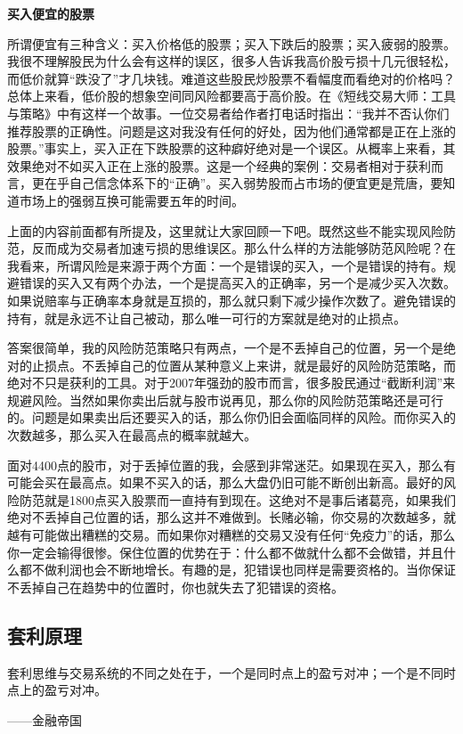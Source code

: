 \textbf{买入便宜的股票}

所谓便宜有三种含义：买入价格低的股票；买入下跌后的股票；买入疲弱的股票。我很不理解股民为什么会有这样的误区，很多人告诉我高价股亏损十几元很轻松，而低价就算“跌没了”才几块钱。难道这些股民炒股票不看幅度而看绝对的价格吗？总体上来看，低价股的想象空间同风险都要高于高价股。在《短线交易大师：工具与策略》中有这样一个故事。一位交易者给作者打电话时指出：“我并不否认你们推荐股票的正确性。问题是这对我没有任何的好处，因为他们通常都是正在上涨的股票。”事实上，买入正在下跌股票的这种癖好绝对是一个误区。从概率上来看，其效果绝对不如买入正在上涨的股票。这是一个经典的案例：交易者相对于获利而言，更在乎自己信念体系下的“正确”。买入弱势股而占市场的便宜更是荒唐，要知道市场上的强弱互换可能需要五年的时间。

上面的内容前面都有所提及，这里就让大家回顾一下吧。既然这些不能实现风险防范，反而成为交易者加速亏损的思维误区。那么什么样的方法能够防范风险呢？在我看来，所谓风险是来源于两个方面：一个是错误的买入，一个是错误的持有。规避错误的买入又有两个办法，一个是提高买入的正确率，另一个是减少买入次数。如果说赔率与正确率本身就是互损的，那么就只剩下减少操作次数了。避免错误的持有，就是永远不让自己被动，那么唯一可行的方案就是绝对的止损点。

答案很简单，我的风险防范策略只有两点，一个是不丢掉自己的位置，另一个是绝对的止损点。不丢掉自己的位置从某种意义上来讲，就是最好的风险防范策略，而绝对不只是获利的工具。对于2007年强劲的股市而言，很多股民通过“截断利润”来规避风险。当然如果你卖出后就与股市说再见，那么你的风险防范策略还是可行的。问题是如果卖出后还要买入的话，那么你仍旧会面临同样的风险。而你买入的次数越多，那么买入在最高点的概率就越大。

面对4400点的股市，对于丢掉位置的我，会感到非常迷茫。如果现在买入，那么有可能会买在最高点。如果不买入的话，那么大盘仍旧可能不断创出新高。最好的风险防范就是1800点买入股票而一直持有到现在。这绝对不是事后诸葛亮，如果我们绝对不丢掉自己位置的话，那么这并不难做到。长赌必输，你交易的次数越多，就越有可能做出糟糕的交易。而如果你对糟糕的交易又没有任何“免疫力”的话，那么你一定会输得很惨。保住位置的优势在于：什么都不做就什么都不会做错，并且什么都不做利润也会不断地增长。有趣的是，犯错误也同样是需要资格的。当你保证不丢掉自己在趋势中的位置时，你也就失去了犯错误的资格。

\subsection{套利原理}

{\kaishu
套利思维与交易系统的不同之处在于，一个是同时点上的盈亏对冲；一个是不同时点上的盈亏对冲。

\hfill ——金融帝国
}


